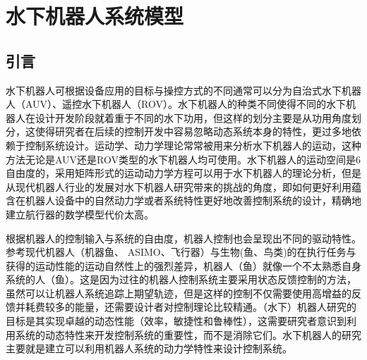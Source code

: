 \newcommand\bu{\bm{u}}
\newcommand\bx{\bm{x}}




\chapter{水下机器人系统模型 }


\label{chap:Theory}
\section{引言}
水下机器人可根据设备应用的目标与操控方式的不同通常可以分为自治式水下机器人（AUV）、遥控水下机器人（ROV）。水下机器人的种类不同使得不同的水下机器人在设计开发阶段就着重于不同的水下功用，但这样的划分主要是从功用角度划分，这使得研究者在后续的控制开发中容易忽略动态系统本身的特性，更过多地依赖于控制系统设计。运动学、动力学理论常常被用来分析水下机器人的运动，这种方法无论是AUV还是ROV类型的水下机器人均可使用。水下机器人的运动空间是6自由度的，采用矩阵形式的运动动力学方程可以用于水下机器人的理论分析，但是从现代机器人行业的发展对水下机器人研究带来的挑战的角度，即如何更好利用蕴含在机器人设备中的自然动力学或者系统特性更好地改善控制系统的设计，精确地建立航行器的数学模型代价太高。

根据机器人的控制输入与系统的自由度，机器人控制也会呈现出不同的驱动特性。参考现代机器人（机器鱼、 ASIMO、飞行器）与生物(鱼、鸟类)的在执行任务与获得的运动性能的运动自然性上的强烈差异，机器人（鱼）就像一个不太熟悉自身系统的人（鱼）\cite{russdrakebook}。这是因为过往的机器人控制系统主要采用状态反馈控制的方法，虽然可以让机器人系统追踪上期望轨迹，但是这样的控制不仅需要使用高增益的反馈并耗费较多的能量，还需要设计者对控制理论比较精通。（水下）机器人研究的目标是其实现卓越的动态性能（效率，敏捷性和鲁棒性），这需要研究者意识到利用系统的动态特性来开发控制系统的重要性，而不是消除它们。水下机器人的研究主要就是建立可以利用机器人系统的动力学特性来设计控制系统。

